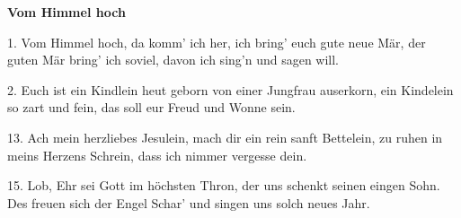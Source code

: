 \documentclass[10pt]{article}
\begin{document}
{\Large
\begin{guitar}
    \textbf{Vom Himmel hoch}


    1. Vom Himmel hoch, da komm' ich her,
    ich bring' euch gute neue Mär,
    der guten Mär bring' ich soviel,
    davon ich sing'n und sagen will.


    2. Euch ist ein Kindlein heut geborn
    von einer Jungfrau auserkorn,
    ein Kindelein so zart und fein,
    das soll eur Freud und Wonne sein.


    13. Ach mein herzliebes Jesulein,
    mach dir ein rein sanft Bettelein,
    zu ruhen in meins Herzens Schrein,
    dass ich nimmer vergesse dein.


    15. Lob, Ehr sei Gott im höchsten Thron,
    der uns schenkt seinen eingen Sohn.
    Des freuen sich der Engel Schar'
    und singen uns solch neues Jahr.
\end{guitar}
}
\end{document}
